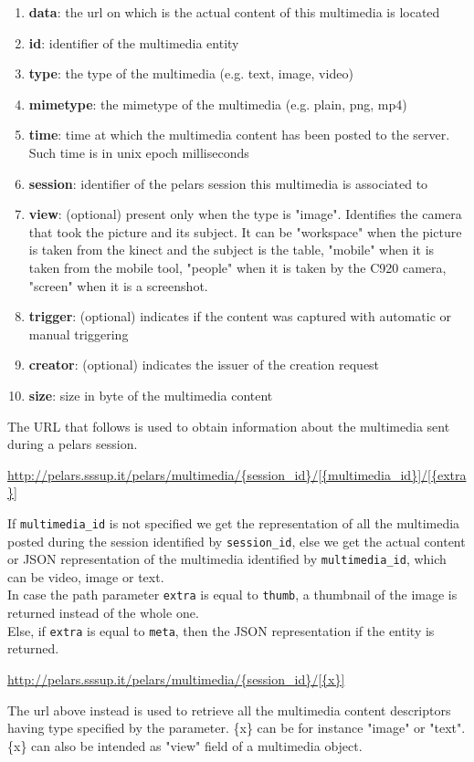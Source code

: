 \documentclass[a4paper,notitlepage,onecolumn]{hitec}  %
\begin{document}
\begin{enumerate}
\item \textbf{data}: the url on which is the actual content of this multimedia is located
\item \textbf{id}: identifier of the multimedia entity
\item \textbf{type}: the type of the multimedia (e.g. text, image, video)
\item \textbf{mimetype}: the mimetype of the multimedia (e.g. plain, png, mp4)
\item \textbf{time}: time at which the multimedia content has been posted to the server. Such time is in unix epoch milliseconds
\item \textbf{session}: identifier of the pelars session this multimedia is associated to
\item \textbf{view}: (optional) present only when the type is "image". Identifies the camera that took the picture and its subject. It can be "workspace" when the picture is taken from the kinect and the subject is the table, "mobile" when it is taken from the mobile tool, "people" when it is taken by the C920 camera, "screen" when it is a screenshot.
\item \textbf{trigger}: (optional) indicates if the content was captured with automatic or manual triggering
\item \textbf{creator}: (optional) indicates the issuer of the creation request
\item \textbf{size}: size in byte of the multimedia content
\end{enumerate}

The URL that follows is used to obtain information about the multimedia sent during a pelars session. 
\begin{center}
\url{http://pelars.sssup.it/pelars/multimedia/{session_id}/[{multimedia_id}]/[{extra}]}
\end{center}
If {\tt multimedia\_id} is not specified we get the representation of all the multimedia posted during the session identified by {\tt session\_id}, else we get the actual content or JSON representation of the multimedia identified by {\tt multimedia\_id}, which can be video, image or text.\\
In case the path parameter {\tt extra} is equal to {\tt thumb}, a thumbnail of the image is returned instead of the whole one.\\
Else, if {\tt extra} is equal to {\tt meta}, then the JSON representation if the entity is returned.
\begin{center}
\url{http://pelars.sssup.it/pelars/multimedia/{session_id}/[{x}]}
\end{center}
The url above instead is used to retrieve all the multimedia content descriptors having type specified by the parameter. \{x\} can be for instance "image" or "text".\\
\{x\} can also be intended as "view" field of a multimedia object.
\end{document}
